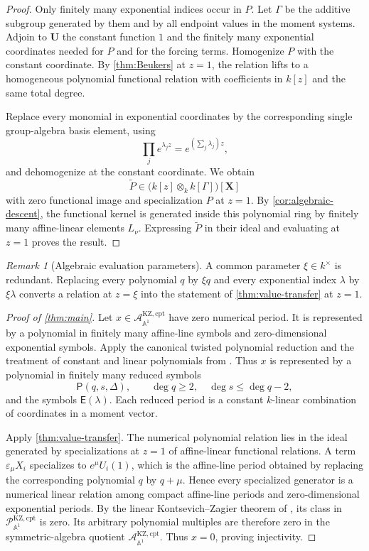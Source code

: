 \documentclass[11pt]{article}
\numberwithin{equation}{section}
\theoremstyle{definition}
\theoremstyle{remark}
\newtheorem{remark}[remark]{Remark}
\newcommand{\Aone}{\mathbb A^1}
\newcommand{\Pcal}{\mathcal P}
\newcommand{\Acal}{\mathcal A}
\begin{document}
\begin{proof}
Only finitely many exponential indices occur in $P$.  Let $\Gamma$ be the
additive subgroup generated by them and by all endpoint values in the moment
systems.  Adjoin to $\mathbf U$ the constant function $1$ and the finitely
many exponential coordinates needed for $P$ and for the forcing terms.
Homogenize $P$ with the constant coordinate.  By
\cref{thm:Beukers} at $z=1$, the relation lifts to a homogeneous polynomial
functional relation with coefficients in $k[z]$ and the same total degree.

Replace every monomial in exponential coordinates by the corresponding
single group-algebra basis element, using
\[
  \prod_j e^{\lambda_jz}=e^{(\sum_j\lambda_j)z},
\]
and dehomogenize at the constant coordinate.  We obtain
\[
  \widetilde P\in
  \bigl(k[z]\otimes_k k[\Gamma]\bigr)[\mathbf X]
\]
with zero functional image and specialization $P$ at $z=1$.  By
\cref{cor:algebraic-descent}, the functional kernel is generated inside this
polynomial ring by finitely many affine-linear elements $L_\nu$.  Expressing
$\widetilde P$ in their ideal and evaluating at $z=1$ proves the result.
\end{proof}

\begin{remark}[Algebraic evaluation parameters]
A common parameter $\xi\in k^\times$ is redundant.  Replacing every
polynomial $q$ by $\xi q$ and every exponential index $\lambda$ by
$\xi\lambda$ converts a relation at $z=\xi$ into the statement of
\cref{thm:value-transfer} at $z=1$.
\end{remark}

\begin{proof}[Proof of \cref{thm:main}]
Let $x\in\Acal_{\Aone}^{\mathrm{KZ,cpt}}$ have zero numerical period.  It is
represented by a polynomial in finitely many affine-line symbols and
zero-dimensional exponential symbols.  Apply the canonical twisted
polynomial reduction and the treatment of constant and linear polynomials
from \cite{LongLinearKZ}.  Thus $x$ is represented by a polynomial in
finitely many reduced symbols
\[
  \mathsf P(q,s,\Delta),
  \qquad
  \deg q\ge2,
  \quad
  \deg s\le\deg q-2,
\]
and the symbols $\mathsf E(\lambda)$.  Each reduced period is a constant
$k$-linear combination of coordinates in a moment vector.

Apply \cref{thm:value-transfer}.  The numerical polynomial relation lies in
the ideal generated by specializations at $z=1$ of affine-linear functional
relations.  A term
$\varepsilon_\mu X_i$ specializes to $e^\mu U_i(1)$, which is the affine-line
period obtained by replacing the corresponding polynomial $q$ by
$q+\mu$.  Hence every specialized generator is a numerical linear relation
among compact affine-line periods and zero-dimensional exponential periods.
By the linear Kontsevich--Zagier theorem of \cite{LongLinearKZ}, its class in
$\Pcal_{\Aone}^{\mathrm{KZ,cpt}}$ is zero.  Its arbitrary polynomial
multiples are therefore zero in the symmetric-algebra quotient
$\Acal_{\Aone}^{\mathrm{KZ,cpt}}$.  Thus $x=0$, proving injectivity.

\end{proof}
\end{document}
